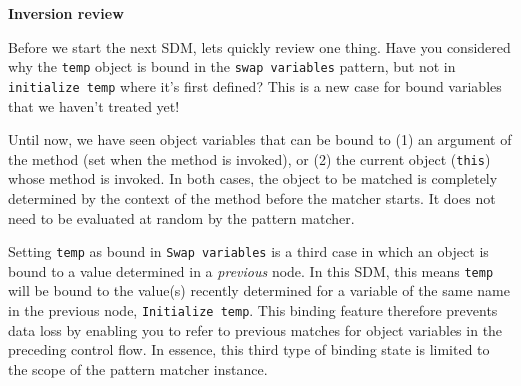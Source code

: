 \newpage
\genHeader
\hypertarget{invert close}{}

{\Large \bf Inversion review}

Before we start the next SDM, lets quickly review one thing. Have you considered why the \texttt{temp} object is bound in the \texttt{swap variables}
pattern, but not in \texttt{initialize temp} where it's first defined? This is a new case for bound variables that we haven't treated yet!

Until now, we have seen object variables that can be bound to (1) an argument of the method (set when the method is invoked), or (2) the
current object (\texttt{this}) whose method is invoked. In both cases, the object to be matched is completely determined by the context of the method before
the matcher starts. It does not need to be evaluated at random by the pattern matcher.

Setting \texttt{temp} as bound in \texttt{Swap variables} is a third case in which an object is bound to a value determined in a \emph{previous} node. In
this SDM, this means \texttt{temp} will be bound to the value(s) recently determined for a variable of the same name in the previous node, \texttt{Initialize
temp}. This binding feature therefore prevents data loss by enabling you to refer to previous matches for object variables in the preceding control flow. In
essence, this third type of binding state is limited to the scope of the pattern matcher instance.
